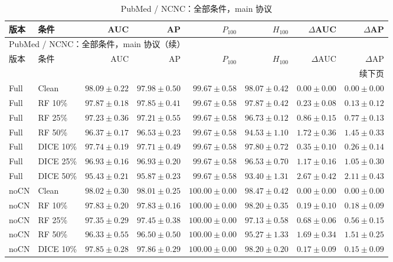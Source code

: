 {\footnotesize
\setlength{\tabcolsep}{3.2pt}
\renewcommand{\arraystretch}{1.10}
\begin{longtable}{llrrrrrr}
\caption{PubMed / NCNC：全部条件，main 协议}\\
\toprule
版本 & 条件 & AUC & AP & $P_{100}$ & $H_{100}$ & $\Delta$AUC & $\Delta$AP \\
\midrule
\endfirsthead
\multicolumn{8}{l}{PubMed / NCNC：全部条件，main 协议（续）}\\
\toprule
版本 & 条件 & AUC & AP & $P_{100}$ & $H_{100}$ & $\Delta$AUC & $\Delta$AP \\
\midrule
\endhead
\midrule\multicolumn{8}{r}{续下页}\\
\endfoot
\bottomrule
\endlastfoot
Full & Clean & $98.09\pm0.22$ & $97.98\pm0.50$ & $99.67\pm0.58$ & $98.07\pm0.42$ & $0.00\pm0.00$ & $0.00\pm0.00$ \\
Full & RF 10\% & $97.87\pm0.18$ & $97.85\pm0.41$ & $99.67\pm0.58$ & $97.87\pm0.42$ & $0.23\pm0.08$ & $0.13\pm0.12$ \\
Full & RF 25\% & $97.23\pm0.36$ & $97.21\pm0.55$ & $99.67\pm0.58$ & $96.73\pm0.12$ & $0.86\pm0.15$ & $0.77\pm0.13$ \\
Full & RF 50\% & $96.37\pm0.17$ & $96.53\pm0.23$ & $99.67\pm0.58$ & $94.53\pm1.10$ & $1.72\pm0.36$ & $1.45\pm0.33$ \\
Full & DICE 10\% & $97.74\pm0.19$ & $97.71\pm0.49$ & $99.67\pm0.58$ & $97.80\pm0.72$ & $0.35\pm0.10$ & $0.26\pm0.14$ \\
Full & DICE 25\% & $96.93\pm0.16$ & $96.93\pm0.20$ & $99.67\pm0.58$ & $96.53\pm0.70$ & $1.17\pm0.16$ & $1.05\pm0.30$ \\
Full & DICE 50\% & $95.43\pm0.21$ & $95.87\pm0.23$ & $99.67\pm0.58$ & $93.40\pm1.31$ & $2.67\pm0.42$ & $2.11\pm0.43$ \\
noCN & Clean & $98.02\pm0.30$ & $98.01\pm0.25$ & $100.00\pm0.00$ & $98.47\pm0.42$ & $0.00\pm0.00$ & $0.00\pm0.00$ \\
noCN & RF 10\% & $97.83\pm0.20$ & $97.83\pm0.16$ & $100.00\pm0.00$ & $98.20\pm0.35$ & $0.19\pm0.10$ & $0.18\pm0.09$ \\
noCN & RF 25\% & $97.35\pm0.29$ & $97.45\pm0.38$ & $100.00\pm0.00$ & $97.13\pm0.58$ & $0.68\pm0.06$ & $0.56\pm0.15$ \\
noCN & RF 50\% & $96.33\pm0.55$ & $96.50\pm0.50$ & $100.00\pm0.00$ & $95.27\pm1.33$ & $1.69\pm0.34$ & $1.51\pm0.25$ \\
noCN & DICE 10\% & $97.85\pm0.28$ & $97.86\pm0.29$ & $100.00\pm0.00$ & $98.20\pm0.20$ & $0.17\pm0.09$ & $0.15\pm0.09$ \\

\end{longtable}}
